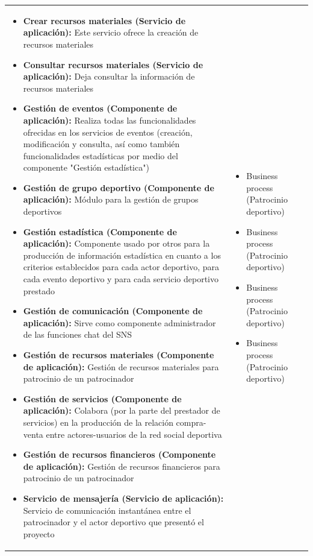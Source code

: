 \begin{table}[!htb]
\begin{center}
{\begin{tabular}{|p{7cm}|p{4cm}|}
\begin{itemize}
				\item \textbf{Crear recursos materiales (Servicio de aplicación):} Este servicio ofrece la creación de recursos materiales
				\item \textbf{Consultar recursos materiales (Servicio de aplicación):} Deja consultar la información de recursos materiales
				\item \textbf{Gestión de eventos (Componente de aplicación):} Realiza todas las funcionalidades ofrecidas en los servicios de eventos (creación, modificación y consulta, así como también funcionalidades estadísticas por medio del componente "Gestión estadística")
				\item \textbf{Gestión de grupo deportivo (Componente de aplicación):} Módulo para la gestión de grupos deportivos
				\item \textbf{Gestión estadística (Componente de aplicación):} Componente usado por otros para la producción de información estadística en cuanto a los criterios establecidos para cada actor deportivo, para cada evento deportivo y para cada servicio deportivo prestado
				\item \textbf{Gestión de comunicación (Componente de aplicación):} Sirve como componente administrador de las funciones chat del SNS
				\item \textbf{Gestión de recursos materiales (Componente de aplicación):} Gestión de recursos materiales para patrocinio de un patrocinador
				\item \textbf{Gestión de servicios (Componente de aplicación):} Colabora (por la parte del prestador de servicios) en la producción de la relación compra-venta entre actores-usuarios de la red social deportiva
				\item \textbf{Gestión de recursos financieros (Componente de aplicación):} Gestión de recursos financieros para patrocinio de un patrocinador
				\item \textbf{Servicio de mensajería (Servicio de aplicación):} Servicio de comunicación instantánea entre el patrocinador y el actor deportivo que presentó el proyecto
			\end{itemize} 
			&
			\begin{itemize}
				\item Business process (Patrocinio deportivo)
				\item Business process (Patrocinio deportivo)
				\item Business process (Patrocinio deportivo)
				\item Business process (Patrocinio deportivo)

\end{itemize}
\end{tabular}}
\end{center}
\end{table}
